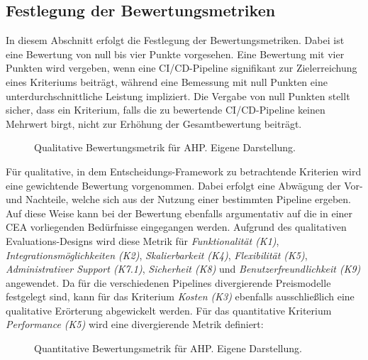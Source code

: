 \subsection{Festlegung der Bewertungsmetriken}
\label{sec:Metriken}
In diesem Abschnitt erfolgt die Festlegung der Bewertungsmetriken. Dabei ist eine Bewertung von null bis vier Punkte vorgesehen. Eine Bewertung mit vier Punkten wird vergeben, wenn eine CI/CD-Pipeline signifikant zur Zielerreichung eines Kriteriums beiträgt, während eine Bemessung mit null Punkten eine unterdurchschnittliche Leistung impliziert. Die Vergabe von null Punkten stellt sicher, dass ein Kriterium, falls die zu bewertende CI/CD-Pipeline keinen Mehrwert birgt, nicht zur Erhöhung der Gesamtbewertung beiträgt. 
\begin{center}
	\begin{figure}[H]
		\centering
		\caption[Qualitative Bewertungsmetrik für AHP]{Qualitative Bewertungsmetrik für AHP. Eigene Darstellung.}
		\label{fig:metrik}
	\end{figure}
\end{center}
\vspace*{-15mm}
Für qualitative, in dem Entscheidungs-Framework zu betrachtende Kriterien wird eine gewichtende Bewertung vorgenommen. Dabei erfolgt eine Abwägung der Vor- und Nachteile, welche sich aus der Nutzung einer bestimmten Pipeline ergeben. Auf diese Weise kann bei der Bewertung ebenfalls argumentativ auf die in einer CEA vorliegenden Bedürfnisse eingegangen werden.
Aufgrund des qualitativen Evaluations-Designs wird diese Metrik für \textit{Funktionalität (K1)}, \textit{Integrationsmöglichkeiten (K2)}, \textit{Skalierbarkeit (K4)}, \textit{Flexibilität (K5)}, \textit{Administrativer Support (K7.1)}, \textit{Sicherheit (K8)} und \textit{Benutzerfreundlichkeit (K9)} angewendet. Da für die verschiedenen Pipelines divergierende Preismodelle festgelegt sind, kann für das Kriterium \textit{Kosten (K3)} ebenfalls ausschließlich eine qualitative Erörterung abgewickelt werden. Für das quantitative Kriterium \textit{Performance (K5)} wird eine divergierende Metrik definiert: 
\begin{center}
	\begin{figure}[H]
		\centering
		\caption[Quantitative Bewertungsmetrik für AHP]{Quantitative Bewertungsmetrik für AHP. Eigene Darstellung.}
		\label{fig:metrik_qual}
	\end{figure}
\end{center}
